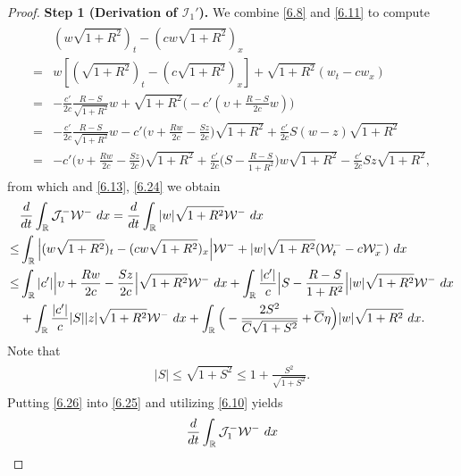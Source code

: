 \documentclass[10pt,a4paper]{amsart}
\newcommand{\fr}{\frac}
\begin{document}
\begin{proof}
\textbf{Step 1 (Derivation of $\mathcal{I}_{1}'$).} We combine \eqref{6.8} and \eqref{6.11} to compute
\begin{align*}
\begin{split}
&(w\sqrt{1+R^2})_t-(cw\sqrt{1+R^2})_x \\
=& w[(\sqrt{1+R^2})_t -(c\sqrt{1+R^2})_x] +\sqrt{1+R^2}(w_t-cw_x) \\
=&-\fr{c'}{2c}\fr{R-S}{\sqrt{1+R^2}}w +\sqrt{1+R^2}\Big(-c'(\upsilon+\fr{R-S}{2c}w)\Big) \\
=&-\fr{c'}{2c}\fr{R-S}{\sqrt{1+R^2}}w -c'\Big(v+\fr{Rw}{2c}-\fr{Sz}{2c}\Big)\sqrt{1+R^2} +\fr{c'}{2c}S(w-z)\sqrt{1+R^2} \\
=&-c'\Big(\upsilon+\fr{Rw}{2c}-\fr{Sz}{2c}\Big)\sqrt{1+R^2}  +\fr{c'}{2c}\Big(S-\fr{R-S}{1+R^2}\Big)w\sqrt{1+R^2} -\fr{c'}{2c}Sz\sqrt{1+R^2},
\end{split}
\end{align*}
from which and \eqref{6.13}, \eqref{6.24} we obtain
\begin{align}\label{6.25}
\begin{split}
&\fr{{\rm d}}{{\rm d}t}\int_{\mathbb{R}} \mathcal{J}_{1}^-\mathcal{W}^-\ {\rm d}x=\fr{{\rm d}}{{\rm d}t}\int_{\mathbb{R}}|w|\sqrt{1+R^2}\mathcal{W}^-\ {\rm d}x \\
\leq &\int_{\mathbb{R}}\Big|(w\sqrt{1+R^2})_t -(cw\sqrt{1+R^2})_x\Big|\mathcal{W}^- +|w|\sqrt{1+R^2}(\mathcal{W}^{-}_t-c\mathcal{W}^{-}_x)\ {\rm d}x \\
\leq &\int_{\mathbb{R}}|c'|\Big|\upsilon+\fr{Rw}{2c}-\fr{Sz}{2c}\Big|\sqrt{1+R^2}\mathcal{W}^-\ {\rm d}x +\int_{\mathbb{R}}\fr{|c'|}{c}\Big|S-\fr{R-S}{1+R^2}\Big||w|\sqrt{1+R^2}\mathcal{W}^-\ {\rm d}x \\ &+\int_{\mathbb{R}}\fr{|c'|}{c}|S||z|\sqrt{1+R^2}\mathcal{W}^-\ {\rm d}x +\int_{\mathbb{R}}\Big(-\fr{2S^2}{\overline{C}\sqrt{1+S^2}}+\overline{C}\eta \Big)|w|\sqrt{1+R^2}\ {\rm d}x.
\end{split}
\end{align}
Note that
\begin{align}\label{6.26}
\begin{split}
|S|\leq \sqrt{1+S^2} \leq 1+\fr{S^2}{\sqrt{1+S^2}}.
\end{split}
\end{align}
Putting \eqref{6.26} into \eqref{6.25} and utilizing \eqref{6.10} yields
\begin{align}\label{6.27}
\begin{split}
&\fr{{\rm d}}{{\rm d}t}\int_{\mathbb{R}} \mathcal{J}_{1}^-\mathcal{W}^-\ {\rm d}x \\

\end{split}
\end{align}
\end{proof}
\end{document}
